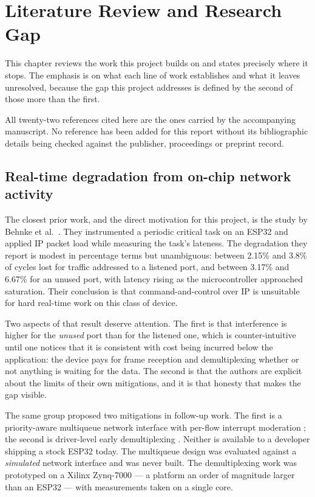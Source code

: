 \chapter{Literature Review and Research Gap}\label{ch:lit}

This chapter reviews the work this project builds on and states precisely where it stops. The
emphasis is on what each line of work establishes and what it leaves unresolved, because the
gap this project addresses is defined by the second of those more than the first.

All twenty-two references cited here are the ones carried by the accompanying manuscript. No
reference has been added for this report without its bibliographic details being checked
against the publisher, proceedings or preprint record.

\section{Real-time degradation from on-chip network activity}

The closest prior work, and the direct motivation for this project, is the study by Behnke et
al.\ \cite{behnke2020}. They instrumented a periodic critical task on an ESP32 and applied IP
packet load while measuring the task's lateness. The degradation they report is modest in
percentage terms but unambiguous: between 2.15\% and 3.8\% of cycles lost for traffic addressed
to a listened port, and between 3.17\% and 6.67\% for an unused port, with latency rising as
the microcontroller approached saturation. Their conclusion is that command-and-control over IP
is unsuitable for hard real-time work on this class of device.

Two aspects of that result deserve attention. The first is that interference is higher for the
\emph{unused} port than for the listened one, which is counter-intuitive until one notices that
it is consistent with cost being incurred below the application: the device pays for frame
reception and demultiplexing whether or not anything is waiting for the data. The second is
that the authors are explicit about the limits of their own mitigations, and it is that honesty
that makes the gap visible.

The same group proposed two mitigations in follow-up work. The first is a priority-aware
multiqueue network interface with per-flow interrupt moderation \cite{behnke2022}; the second is
driver-level early demultiplexing \cite{behnke2023}. Neither is available to a developer
shipping a stock ESP32 today. The multiqueue design was evaluated against a \emph{simulated}
network interface and was never built. The demultiplexing work was prototyped on a Xilinx
Zynq-7000 — a platform an order of magnitude larger than an ESP32 — with measurements taken on
a single core.

